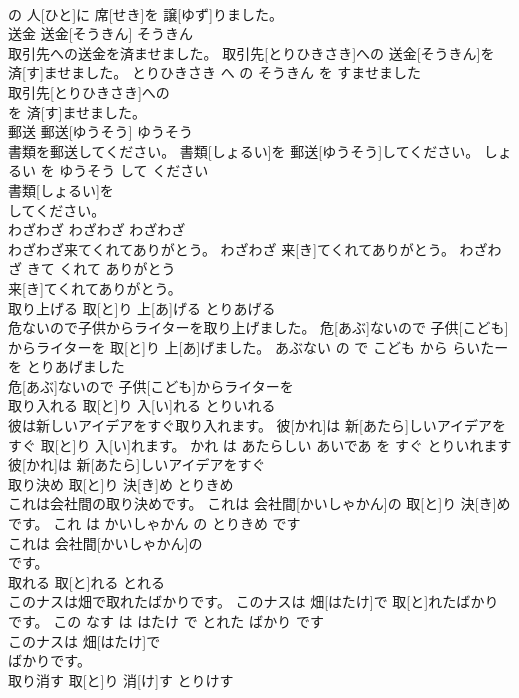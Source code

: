 \documentclass[8pt]{extreport}
\begin{document}
\begin{CJK}{UTF8}{min}
\\	の 人[ひと]に 席[せき]を 譲[ゆず]りました。			
\\	送金	送金[そうきん]	そうきん	
\\	取引先への送金を済ませました。	取引先[とりひきさき]への 送金[そうきん]を 済[す]ませました。	とりひきさき へ の そうきん を すませました	
\\	取引先[とりひきさき]への
\\	を 済[す]ませました。			
\\	郵送	郵送[ゆうそう]	ゆうそう	
\\	書類を郵送してください。	書類[しょるい]を 郵送[ゆうそう]してください。	しょるい を ゆうそう して ください	
\\	書類[しょるい]を
\\	してください。			
\\	わざわざ	わざわざ	わざわざ	
\\	わざわざ来てくれてありがとう。	わざわざ 来[き]てくれてありがとう。	わざわざ きて くれて ありがとう	
\\	来[き]てくれてありがとう。			
\\	取り上げる	取[と]り 上[あ]げる	とりあげる	
\\	危ないので子供からライターを取り上げました。	危[あぶ]ないので 子供[こども]からライターを 取[と]り 上[あ]げました。	あぶない の で こども から らいたー を とりあげました	
\\	危[あぶ]ないので 子供[こども]からライターを
\\	取り入れる	取[と]り 入[い]れる	とりいれる	
\\	彼は新しいアイデアをすぐ取り入れます。	彼[かれ]は 新[あたら]しいアイデアをすぐ 取[と]り 入[い]れます。	かれ は あたらしい あいであ を すぐ とりいれます	
\\	彼[かれ]は 新[あたら]しいアイデアをすぐ
\\	取り決め	取[と]り 決[き]め	とりきめ	
\\	これは会社間の取り決めです。	これは 会社間[かいしゃかん]の 取[と]り 決[き]めです。	これ は かいしゃかん の とりきめ です	
\\	これは 会社間[かいしゃかん]の
\\	です。			
\\	取れる	取[と]れる	とれる	
\\	このナスは畑で取れたばかりです。	このナスは 畑[はたけ]で 取[と]れたばかりです。	この なす は はたけ で とれた ばかり です	
\\	このナスは 畑[はたけ]で
\\	ばかりです。			
\\	取り消す	取[と]り 消[け]す	とりけす	

\end{CJK}
\end{document}
